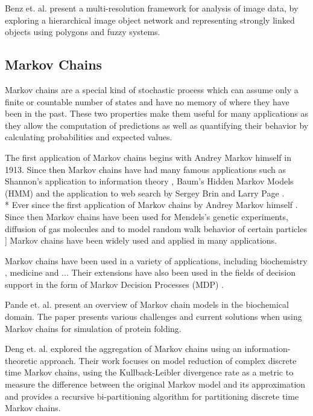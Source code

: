 Benz et. al. \cite{Benz2004239} present a multi-resolution framework for analysis of image data, by exploring a hierarchical
image object network and representing strongly linked objects using polygons and fuzzy systems.

\subsection{Markov Chains}

Markov chains are a special kind of stochastic process
which can assume only a finite or countable number of states and have no memory of where they have been in the past.
These two properties make them useful for many applications as they allow the computation of predictions as
well as quantifying their behavior by calculating probabilities and expected values.

The first application of Markov chains begins with Andrey Markov himself \cite{markov13} in 1913. Since then
Markov chains have had many famous applications such as Shannon's application to information theory \cite{Shannon:1948},
Baum's Hidden Markov Models (HMM) \cite{baum1970} and the application to web search by Sergey Brin and Larry Page \cite{Lawrence981}.
\\*
Ever since the first application of Markov chains by Andrey Markov himself . Since then Markov chains
have been used for Mendels's genetic experiments, diffusion of gas molecules and to model random walk behavior of certain
particles ]
 Markov chains
have been widely used and applied in many applications. 

Markov chains have been used in a variety of applications, including biochemistry \cite{Ciocchetta2009145,pande-beauchamp-bowman:2010:methods:markov-model-review}, 
medicine \cite{TODO} and ... Their extensions have also been used in the fields of decision support in the form of Markov Decision Processes (MDP)
\cite{DBLP:journals/corr/AlsheikhHNTL15,citeulike:13074388}.

Pande et. al. \cite{pande-beauchamp-bowman:2010:methods:markov-model-review} present an overview of Markov chain
models in the biochemical domain. The paper presents various challenges and current solutions when using Markov chains
for simulation of protein folding.

Deng et. al. \cite{5746509} explored the aggregation of Markov chains using an information-theoretic approach.
Their work focuses on model reduction of complex discrete time Markov chains, using the Kullback-Leibler divergence
rate as a metric to measure the difference between the original Markov model and its approximation and
provides a recursive bi-partitioning algorithm for partitioning discrete time Markov chains.

